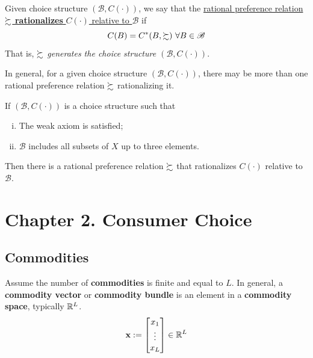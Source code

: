 \documentclass{article}
\begin{document}
		\begin{definition}[1.D.1]
			Given choice structure $(\mathscr{B}, C(\cdot))$, we say that the \ul{rational preference relation $\succsim$ \textbf{rationalizes} $C(\cdot)$ relative to $\mathscr{B}$} if
			\begin{equation}
				C(B) = C^*(B, \succsim)\ \forall B \in \mathscr{B}
			\end{equation}
			That is, \emph{$\succsim$ generates the choice structure $(\mathscr{B}, C(\cdot))$}.
		\end{definition}
		
		\begin{remark}
			In general, for a given choice structure $(\mathscr{B}, C(\cdot))$, there may be more than one rational preference relation $\succsim$ rationalizing it.
		\end{remark}
		
		\begin{proposition}
			If $(\mathscr{B}, C(\cdot))$ is a choice structure such that
			\begin{enumerate}[(i)]
				\item The weak axiom is satisfied;
				\item $\mathscr{B}$ includes all subsets of $X$ up to three elements.
			\end{enumerate}
			Then there is a rational preference relation $\succsim$ that rationalizes $C(\cdot)$ relative to $\mathscr{B}$.
		\end{proposition}
	
	\section{Chapter 2. Consumer Choice}
		\subsection{Commodities}
			\begin{definition}
				Assume the number of \textbf{commodities} is finite and equal to $L$. In general, a \textbf{commodity vector} or \textbf{commodity bundle} is an element in a \textbf{commodity space}, typically $\mathbb{R}^L$.
				\begin{equation}
					\textbf{x} := \begin{bmatrix}
						x_1 \\ \vdots \\ x_L
					\end{bmatrix} \in \mathbb{R}^L
				\end{equation}
 			\end{definition}
 			
\end{document}
